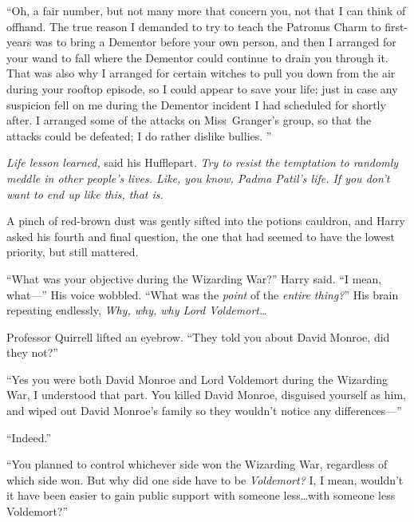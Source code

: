 “Oh, a fair number, but not many more that concern you, not that I can think of offhand. The true reason I demanded to try to teach the Patronus Charm to first-years was to bring a Dementor before your own person, and then I arranged for your wand to fall where the Dementor could continue to drain you through it.  That was also why I arranged for certain witches to pull you down from the air during your rooftop episode, so I could appear to save your life; just in case any suspicion fell on me during the Dementor incident I had scheduled for shortly after.  I arranged some of the attacks on Miss~Granger’s group, so that the attacks could be defeated; I do rather dislike bullies. ”

\emph{Life lesson learned,} said his Hufflepart. \emph{Try to resist the temptation to randomly meddle in other people’s lives. Like, you know, Padma Patil’s life. If you don’t want to end up like this, that is.}

A pinch of red-brown dust was gently sifted into the potions cauldron, and Harry asked his fourth and final question, the one that had seemed to have the lowest priority, but still mattered.

“What was your objective during the Wizarding War?” Harry said. “I mean, what—” His voice wobbled. “What was the \emph{point} of the \emph{entire thing?}” His brain repeating endlessly, \emph{Why, why, why Lord Voldemort…}

Professor Quirrell lifted an eyebrow. “They told you about David Monroe, did they not?”

“Yes you were both David Monroe and Lord Voldemort during the Wizarding War, I understood that part. You killed David Monroe, disguised yourself as him, and wiped out David Monroe’s family so they wouldn’t notice any differences—”

“Indeed.”

“You planned to control whichever side won the Wizarding War, regardless of which side won. But why did one side have to be \emph{Voldemort?} I, I mean, wouldn’t it have been easier to gain public support with someone less…with someone less Voldemort?”

